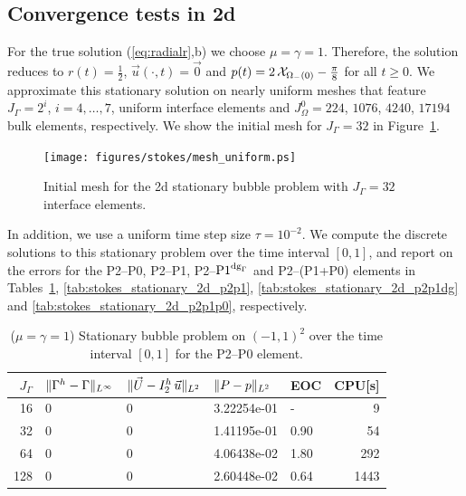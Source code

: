 \subsection{Convergence tests in 2d} \label{sec:stokes_2d_convergence_results}
For the true solution (\ref{eq:radialr},b) we choose $\mu = \gamma = 1$.
Therefore, the solution reduces to $r(t) =
\frac{1}{2}$, $\vec u(\cdot, t) = \vec 0$ and $p(t) = 2\,\mathrm{\mathcal{X}}_{\Omega_-(0)} -
\frac{\pi}{8}$ for all $t \geq 0$. We approximate this stationary solution on
nearly uniform meshes that feature $J_\Gamma = 2^i$, $i=4,\ldots,7$, uniform
interface elements and $J_\Omega^0 = 224$, $1076$, $4240$, $17194$ bulk
elements, respectively. We show the initial mesh for $J_\Gamma = 32$ in
Figure~\ref{fig:meshes_uniform}.
\begin{figure}[htbp]
\centering
\texttt{[image: figures/stokes/mesh\_uniform.ps]}
\caption[Stokes 2d stationary bubble initial mesh]
{Initial mesh for the 2d stationary bubble problem with $J_\Gamma = 32$
interface elements.}
\label{fig:meshes_uniform}
\end{figure}
In addition, we use a uniform time step size $\tau=10^{-2}$.
We compute the discrete solutions to this stationary problem over the time
interval $[0,1]$, and report on the errors for the P2--P0, P2--P1, P2--${\rm P1}^{{\rm dg}_\Gamma}$
and P2--(P1+P0) elements in Tables~\ref{tab:stokes_stationary_2d_p2p0},
\ref{tab:stokes_stationary_2d_p2p1}, \ref{tab:stokes_stationary_2d_p2p1dg} and
\ref{tab:stokes_stationary_2d_p2p1p0}, respectively.
\begin{table}
\center
\begin{tabular}{rllllr}
\hline
$J_\Gamma$ & $\|\Gamma^h - \Gamma\|_{L^\infty}$ & $\|\vec U - I^h_{2}\,\vec u\|_{L^2}$ & $\|P - p\|_{L^2}$ & EOC & CPU[s] \\
\hline
 16 & 0 & 0 & 3.22254e-01 &    - &    9 \\
 32 & 0 & 0 & 1.41195e-01 & 0.90 &   54 \\
 64 & 0 & 0 & 4.06438e-02 & 1.80 &  292 \\
128 & 0 & 0 & 2.60448e-02 & 0.64 & 1443 \\
\hline
\end{tabular}
\caption[Stokes 2d stationary bubble errors P2--P0]
{($\mu=\gamma=1$) Stationary bubble problem on $(-1,1)^2$ over the time
interval $[0,1]$ for the P2--P0 element.}
\label{tab:stokes_stationary_2d_p2p0}
\end{table}
